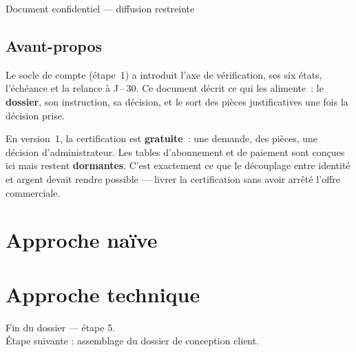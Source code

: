 \documentclass[11pt,a4paper,oneside]{report}
\begin{document}
\begin{titlepage}
\vspace{0.8cm}
\begin{center}\color{AlanyaGray}\small\sffamily
  Document confidentiel --- diffusion restreinte
\end{center}
\end{titlepage}

\chapter*{Avant-propos}
\thispagestyle{plain}

Le socle de compte (étape~1) a introduit l'axe de vérification, ses six états, l'échéance et
la relance à J\,--\,30. Ce document décrit ce qui les alimente~: le \textbf{dossier}, son
instruction, sa décision, et le sort des pièces justificatives une fois la décision prise.

\begin{note}
En version~1, la certification est \textbf{gratuite}~: une demande, des pièces, une décision
d'administrateur. Les tables d'abonnement et de paiement sont conçues ici mais restent
\textbf{dormantes}. C'est exactement ce que le découplage entre identité et argent devait
rendre possible --- livrer la certification sans avoir arrêté l'offre commerciale.
\end{note}

\tableofcontents

\part{Approche naïve}



\part{Approche technique}



\vfill
\begin{center}\small\color{AlanyaGray}\sffamily
Fin du dossier --- étape 5. \\
Étape suivante : assemblage du dossier de conception client.
\end{center}
\end{document}
